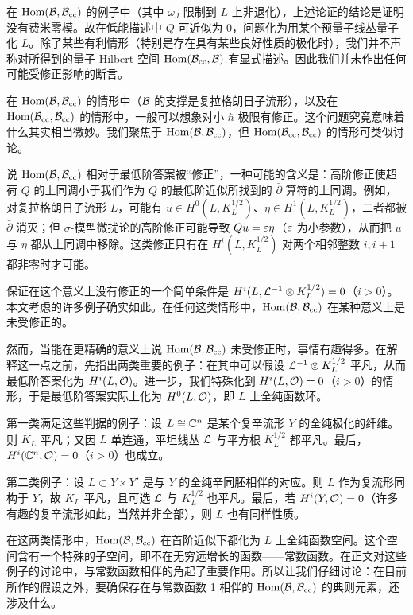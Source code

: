 在 ${\mathrm{Hom}}({\mathcal B},{\mathcal B}_{\mathrm{cc}})$ 的例子中（其中 $\omega_J$ 限制到 $L$ 上非退化），上述论证的结论是证明没有费米零模。故在低能描述中 $Q$ 可近似为 0，问题化为用某个预量子线丛量子化 $L$。除了某些有利情形（特别是存在具有某些良好性质的极化时），我们并不声称对所得到的量子 Hilbert 空间 ${\mathrm{Hom}}({\mathcal B}_{\mathrm{cc}},{\mathcal B})$ 有显式描述。因此我们并未作出任何可能受修正影响的断言。

在 ${\mathrm{Hom}}({\mathcal B},{\mathcal B}_{\mathrm{cc}})$ 的情形中（${\mathcal B}$ 的支撑是复拉格朗日子流形），以及在 ${\mathrm{Hom}}({\mathcal B}_{\mathrm{cc}},{\mathcal B}_{\mathrm{cc}})$ 的情形中，一般可以想象对小 $\hbar$ 极限有修正。这个问题究竟意味着什么其实相当微妙。我们聚焦于 ${\mathrm{Hom}}({\mathcal B},{\mathcal B}_{\mathrm{cc}})$，但 ${\mathrm{Hom}}({\mathcal B}_{\mathrm{cc}},{\mathcal B}_{\mathrm{cc}})$ 的情形可类似讨论。

说 ${\mathrm{Hom}}({\mathcal B},{\mathcal B}_{\mathrm{cc}})$ 相对于最低阶答案被“修正”，一种可能的含义是：高阶修正使超荷 $Q$ 的上同调小于我们作为 $Q$ 的最低阶近似所找到的 $\bar\partial$ 算符的上同调。例如，对复拉格朗日子流形 $L$，可能有 $u\in H^0(L,K_L^{1/2})$、$\eta\in H^1(L,K_L^{1/2})$，二者都被 $\bar\partial$ 消灭；但 $\sigma$-模型微扰论的高阶修正可能导致 $Qu=\varepsilon\eta$（$\varepsilon$ 为小参数），从而把 $u$ 与 $\eta$ 都从上同调中移除。这类修正只有在 $H^i(L,K_L^{1/2})$ 对两个相邻整数 $i,i+1$ 都非零时才可能。

保证在这个意义上没有修正的一个简单条件是 $H^i(L,{\mathcal L}^{-1}\otimes K_L^{1/2})=0$（$i>0$）。本文考虑的许多例子确实如此。在任何这类情形中，${\mathrm{Hom}}({\mathcal B},{\mathcal B}_{\mathrm{cc}})$ 在某种意义上是未受修正的。

然而，当能在更精确的意义上说 ${\mathrm{Hom}}({\mathcal B},{\mathcal B}_{\mathrm{cc}})$ 未受修正时，事情有趣得多。在解释这一点之前，先指出两类重要的例子：在其中可以假设 ${\mathcal L}^{-1}\otimes K_L^{1/2}$ 平凡，从而最低阶答案化为 $H^i(L,{\mathcal O})$。进一步，我们特殊化到 $H^i(L,{\mathcal O})=0$（$i>0$）的情形，于是最低阶答案实际上化为 $H^0(L,{\mathcal O})$，即 $L$ 上全纯函数环。

第一类满足这些判据的例子：设 $L\cong{\mathbb C}^n$ 是某个复辛流形 $Y$ 的全纯极化的纤维。则 $K_L$ 平凡；又因 $L$ 单连通，平坦线丛 ${\mathcal L}$ 与平方根 $K_L^{1/2}$ 都平凡。最后，$H^i({\mathbb C}^n,{\mathcal O})=0$（$i>0$）也成立。

第二类例子：设 $L\subset Y\times Y'$ 是与 $Y$ 的全纯辛同胚相伴的对应。则 $L$ 作为复流形同构于 $Y$，故 $K_L$ 平凡，且可选 ${\mathcal L}$ 与 $K_L^{1/2}$ 也平凡。最后，若 $H^i(Y,{\mathcal O})=0$（许多有趣的复辛流形如此，当然并非全部），则 $L$ 也有同样性质。

在这两类情形中，${\mathrm{Hom}}({\mathcal B},{\mathcal B}_{\mathrm{cc}})$ 在首阶近似下都化为 $L$ 上全纯函数空间。这个空间含有一个特殊的子空间，即不在无穷远增长的函数——常数函数。在正文对这些例子的讨论中，与常数函数相伴的角起了重要作用。所以让我们仔细讨论：在目前所作的假设之外，要确保存在与常数函数 1 相伴的 ${\mathrm{Hom}}({\mathcal B},{\mathcal B}_{\mathrm{cc}})$ 的典则元素，还涉及什么。

